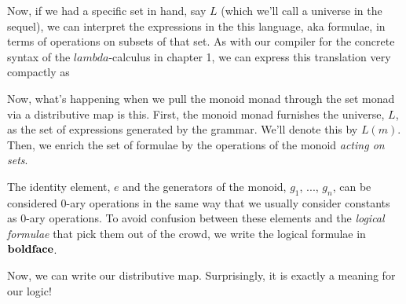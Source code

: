 Now, if we had a specific set in hand, say $L$ (which we'll call a
universe in the sequel), we can interpret the expressions in the this
language, aka formulae, in terms of operations on subsets of that
set. As with our compiler for the concrete syntax of the
$lambda$-calculus in chapter 1, we can express this translation very
compactly as


Now, what's happening when we pull the monoid monad through the set
monad via a distributive map is this. First, the monoid monad
furnishes the universe, $L$, as the set of expressions generated by
the grammar. We'll denote this by $L(m)$. Then, we enrich the set of
formulae by the operations of the monoid \emph{acting on sets}.


The identity element, $e$ and the generators of the monoid, $g_1$,
..., $g_n$, can be considered $0$-ary operations in the same way that
we usually consider constants as $0$-ary operations. To avoid
confusion between these elements and the \emph{logical formulae} that
pick them out of the crowd, we write the logical formulae in
$\bf{boldface}$.

Now, we can write our distributive map. Surprisingly, it is exactly a
meaning for our logic!


